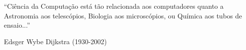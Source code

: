 \newpage
\pagestyle{empty} %

\vspace*{\fill}
\epigraph{``Ciência da Computação está tão relacionada aos computadores quanto a Astronomia aos telescópios, Biologia aos microscópios, ou Química aos tubos de ensaio...''}{Edsger Wybe Dijkstra (1930-2002)}
	
\pagestyle{fancy} %